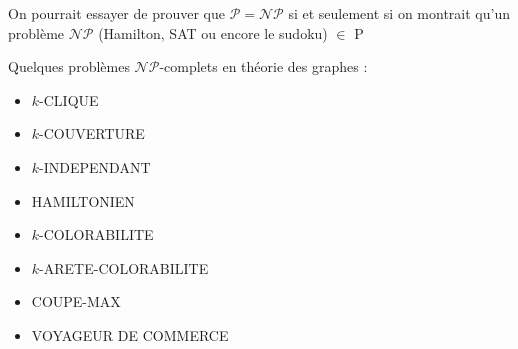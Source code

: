 \begin{mydef}
On pourrait essayer de prouver que $\mathcal{P}=\mathcal{NP}$ si et seulement si on montrait qu'un problème $\mathcal{NP}$  (Hamilton, SAT ou encore le sudoku) $\in$ P
\end{mydef}

\begin{myexem}
  Quelques problèmes $\mathcal{NP}$-complets en théorie des graphes :
  \begin{itemize}
    \item $k$-CLIQUE
    \item $k$-COUVERTURE
    \item $k$-INDEPENDANT
    \item HAMILTONIEN
    \item $k$-COLORABILITE
    \item $k$-ARETE-COLORABILITE
    \item COUPE-MAX
    \item VOYAGEUR DE COMMERCE
  \end{itemize}
\end{myexem}


